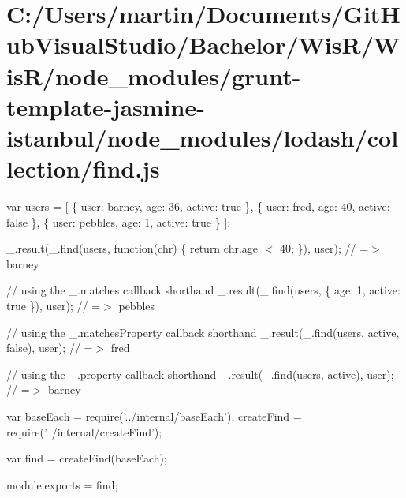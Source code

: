 \hypertarget{_c_1_2_users_2martin_2_documents_2_git_hub_visual_studio_2_bachelor_2_wis_r_2_wis_r_2node_module9b78c9929b6e9e99dc81015a36994d10}{}\section{C\+:/\+Users/martin/\+Documents/\+Git\+Hub\+Visual\+Studio/\+Bachelor/\+Wis\+R/\+Wis\+R/node\+\_\+modules/grunt-\/template-\/jasmine-\/istanbul/node\+\_\+modules/lodash/collection/find.\+js}
var users = \mbox{[} \{ \textquotesingle{}user\textquotesingle{}\+: \textquotesingle{}barney\textquotesingle{}, \textquotesingle{}age\textquotesingle{}\+: 36, \textquotesingle{}active\textquotesingle{}\+: true \}, \{ \textquotesingle{}user\textquotesingle{}\+: \textquotesingle{}fred\textquotesingle{}, \textquotesingle{}age\textquotesingle{}\+: 40, \textquotesingle{}active\textquotesingle{}\+: false \}, \{ \textquotesingle{}user\textquotesingle{}\+: \textquotesingle{}pebbles\textquotesingle{}, \textquotesingle{}age\textquotesingle{}\+: 1, \textquotesingle{}active\textquotesingle{}\+: true \} \mbox{]};

\+\_\+.\+result(\+\_\+.\+find(users, function(chr) \{ return chr.\+age $<$ 40; \}), \textquotesingle{}user\textquotesingle{}); // =$>$ \textquotesingle{}barney\textquotesingle{}

// using the {\ttfamily \+\_\+.\+matches} callback shorthand \+\_\+.\+result(\+\_\+.\+find(users, \{ \textquotesingle{}age\textquotesingle{}\+: 1, \textquotesingle{}active\textquotesingle{}\+: true \}), \textquotesingle{}user\textquotesingle{}); // =$>$ \textquotesingle{}pebbles\textquotesingle{}

// using the {\ttfamily \+\_\+.\+matches\+Property} callback shorthand \+\_\+.\+result(\+\_\+.\+find(users, \textquotesingle{}active\textquotesingle{}, false), \textquotesingle{}user\textquotesingle{}); // =$>$ \textquotesingle{}fred\textquotesingle{}

// using the {\ttfamily \+\_\+.\+property} callback shorthand \+\_\+.\+result(\+\_\+.\+find(users, \textquotesingle{}active\textquotesingle{}), \textquotesingle{}user\textquotesingle{}); // =$>$ \textquotesingle{}barney\textquotesingle{}


\begin{DoxyCodeInclude}
var baseEach = require(\textcolor{stringliteral}{'../internal/baseEach'}),
    createFind = require(\textcolor{stringliteral}{'../internal/createFind'});

var find = createFind(baseEach);

module.exports = find;
\end{DoxyCodeInclude}
 
